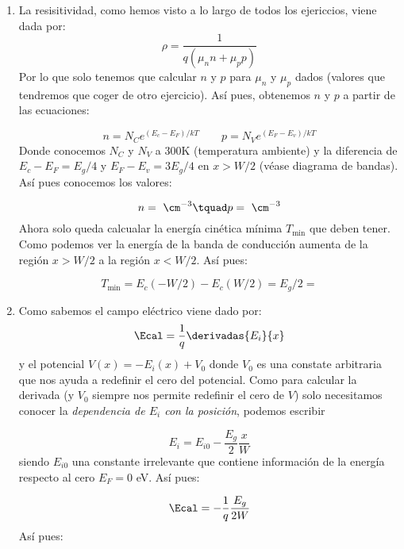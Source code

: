 	
	\begin{enumerate}[label=\alph*)]
		\item La resisitividad, como hemos visto a lo largo de todos los ejericcios, viene dada por:
		\begin{equation}
			\rho = \frac{1}{q(\mu_n n + \mu_p p)}
		\end{equation}
		Por lo que solo tenemos que calcular $n$ y $p$ para $\mu_n$ y $\mu_p$ dados (valores que tendremos que coger de otro ejercicio). Así pues, obtenemos $n$ y $p$ a partir de las ecuaciones:

		\begin{equation}
			n = N_C e^{(E_c-E_F)/kT} \qquad p = N_V e^{(E_F-E_v)/kT}
		\end{equation}
		Donde conocemos $N_C$ y $N_V$ a 300K (temperatura ambiente) y la diferencia de $E_c-E_F=E_g/4$ y $E_F-E_v=3E_g/4$ en $x>W/2$ (véase diagrama de bandas). Así pues conocemos los valores:

		\begin{equation}
			n= \ \cm^{-3} \tquad p = \ \cm^{-3}
		\end{equation}
		Ahora solo queda calcualar la energía cinética mínima $T_{\min}$ que deben tener. Como podemos ver la energía de la banda de conducción aumenta de la región $x>W/2$ a la región $x<W/2$. Así pues:

		\begin{equation}
			T_{\min} = E_c(-W/2) - E_c(W/2) = E_g/2 =
		\end{equation}
		\item Como sabemos el campo eléctrico viene dado por:
		\begin{equation}
			\Ecal = \frac{1}{q} \derivadas{E_i}{x}
		\end{equation}
		y el potencial $V(x)=-E_i(x)+V_0$ donde $V_0$ es una constate arbitraria que nos ayuda a redefinir el cero del potencial. Como para calcular la derivada (y $V_0$ siempre nos permite redefinir el cero de $V$) solo necesitamos conocer la \textit{dependencia de $E_i$ con la posición}, podemos escribir

		\begin{equation}
			E_i = E_{i0} - \frac{E_g}{2} \frac{x}{W}
		\end{equation}
		siendo $E_{i0}$ una constante irrelevante que contiene información de la energía respecto al cero $E_F=0$ eV. Así pues:

		\begin{equation}
			\Ecal = - \frac{1}{q} \frac{E_g}{2W}
		\end{equation}
		Así pues:


\end{enumerate}
